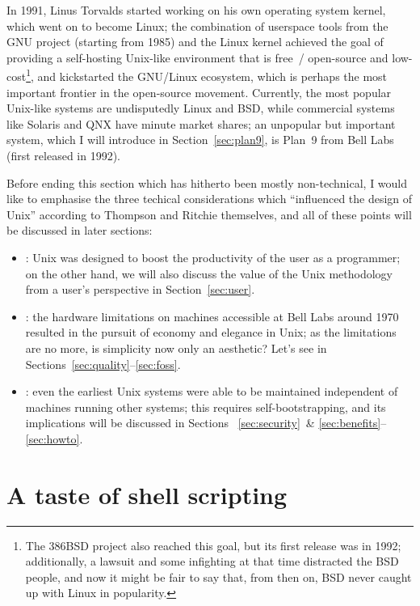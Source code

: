 In 1991, Linus Torvalds started working on his own operating system kernel,
which went on to become Linux; the combination of userspace tools from the
GNU project (starting from 1985) and the Linux kernel achieved the goal of
providing a self-hosting Unix-like environment that is free~/ open-source and
low-cost\footnote{The 386BSD project also reached this goal, but its first
release was in 1992; additionally, a lawsuit and some infighting at that
time distracted the BSD people, and now it might be
fair to say that, from then on, BSD never caught up with Linux in popularity.},
and kickstarted the GNU/Linux ecosystem, which is perhaps the most important
frontier in the open-source movement.  Currently, the most popular Unix-like
systems are undisputedly Linux and BSD, while commercial systems like Solaris
and QNX have minute market shares; an unpopular but important system,
which I will introduce in Section~\ref{sec:plan9}, is Plan~9
from Bell Labs (first released in 1992).

Before ending this section which has hitherto been mostly non-technical,
I would like to emphasise the three techical considerations which
``influenced the design of Unix'' according to Thompson and Ritchie
themselves, and all of these points
will be discussed in later sections:
\begin{itemize}
\item {}: Unix was designed to boost
	the productivity of the user as a programmer; on the other hand,
	we will also discuss the value of the Unix methodology from
	a user's perspective in Section~\ref{sec:user}.
\item {}: the hardware limitations on machines accessible
	at Bell Labs around 1970 resulted in the pursuit of economy and elegance
	in Unix; as the limitations are no more, is simplicity now only an
	aesthetic?  Let's see in Sections~\ref{sec:quality}--\ref{sec:foss}.
\item {}: even the earliest Unix systems were able to be
	maintained independent of machines running other systems; this requires
	self-bootstrapping, and its implications will be discussed in Sections~%
	\ref{sec:security}~\& \ref{sec:benefits}--\ref{sec:howto}.
\end{itemize}

\section{A taste of shell scripting}\label{sec:shell}

